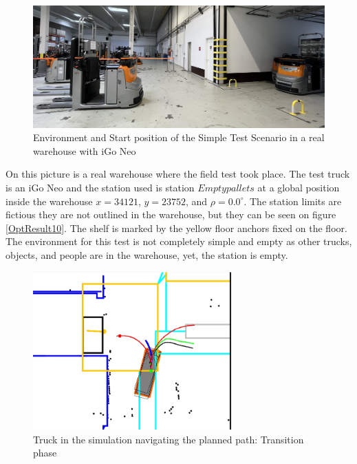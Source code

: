 \begin{figure}[H]
    \begin{center}
        \includegraphics[width=5in]{images/Chap3/Start_Sc1.jpg} %
        \caption{Environment and Start position of the Simple Test Scenario in a real warehouse
        with iGo Neo}
        \label{OptResult11}
        \end{center}    
\end{figure}

On this picture is a real warehouse where the field test took place.
The test truck is an iGo Neo and the station used is station \(Empty pallets\) at a 
global position inside the warehouse \(x = 34121\), \(y = 23752\), and \(\rho = 0.0^\circ\).
The station limits are fictious they are not outlined in the warehouse, 
but they can be seen on figure \ref{OptResult10}.
The shelf is marked by the yellow floor anchors fixed on the floor.
The environment for this test is not completely simple and empty as 
other trucks, objects, and people are in the warehouse, yet, the station is 
empty. 

\begin{figure}[H]
    \begin{center}
        \includegraphics[width=3in]{images/Chap3/Test1_transition.png} %
        \caption{Truck in the simulation navigating the planned path: Transition phase}
        \label{OptResult50}
        \end{center}    
\end{figure}



